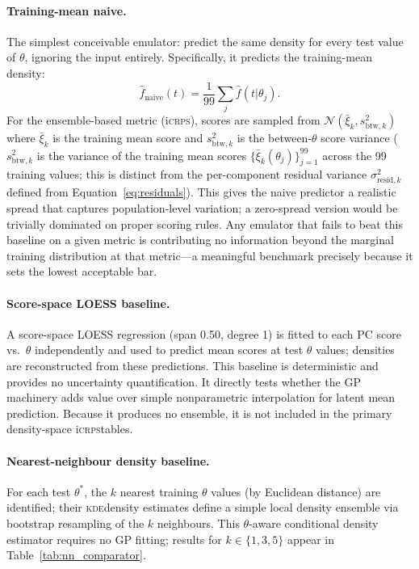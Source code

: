 \documentclass[12pt,a4paper]{article}
\newcommand{\KDE}{\textsc{kde}}
\newcommand{\iCRPS}{i\textsc{crps}}
\newcommand{\spar}{\theta}
\begin{document}
\paragraph{Training-mean naive.}
The simplest conceivable emulator: predict the same density for every
test value of $\spar$, ignoring the input entirely.  Specifically,
it predicts the training-mean density:
\begin{equation}
  \hat{f}_\mathrm{naive}(t)=\frac{1}{99}\sum_j\hat{f}(t|\theta_j).
  \label{eq:naive_mean}
\end{equation}
For the ensemble-based metric (\iCRPS), scores are sampled
from $\mathcal{N}(\bar{\xi}_k,s_{\mathrm{btw},k}^2)$ where
$\bar{\xi}_k$ is the training mean score and $s_{\mathrm{btw},k}^2$
is the between-$\spar$ score variance ($s_{\mathrm{btw},k}^2$ is the
variance of the training mean scores $\{\bar{\xi}_k(\theta_j)\}_{j=1}^{99}$
across the 99 training values; this is distinct from the per-component
residual variance $\sigma^2_{\mathrm{resid},k}$ defined from
Equation~\eqref{eq:residuals}).  This gives the naive
predictor a realistic spread that captures population-level variation;
a zero-spread version would be trivially dominated on proper scoring
rules.  Any emulator that fails to beat this baseline on a given
metric is contributing no information beyond the marginal training
distribution at that metric---a meaningful benchmark precisely because
it sets the lowest acceptable bar.

\paragraph{Score-space LOESS baseline.}
A score-space LOESS regression (span 0.50, degree 1) is fitted to
each PC score vs.\ $\spar$ independently and used to predict mean
scores at test $\spar$ values; densities are reconstructed from these
predictions.  This baseline is deterministic and provides no
uncertainty quantification.  It directly tests whether the GP
machinery adds value over simple nonparametric interpolation for
latent mean prediction.  Because it produces no ensemble, it is not
included in the primary density-space \iCRPS tables.

\paragraph{Nearest-neighbour density baseline.}
For each test $\spar^*$, the $k$ nearest training $\spar$ values
(by Euclidean distance) are identified; their \KDE density estimates
define a simple local density ensemble via bootstrap resampling of the
$k$ neighbours.  This $\spar$-aware conditional density estimator
requires no GP fitting; results for
$k\in\{1,3,5\}$ appear in Table~\ref{tab:nn_comparator}.
\end{document}
